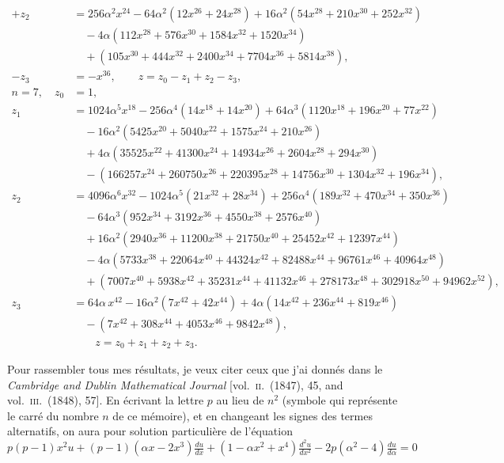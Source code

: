 \documentclass[11pt]{article}
\begin{document}
\[
\begin{aligned}
+z_{2} &= 256\alpha^{2} x^{24} - 64\alpha^{2}(12x^{26} + 24x^{28}) + 16\alpha^{2}(54x^{28} + 210x^{30} + 252x^{32})\\
&\quad - 4\alpha(112x^{28} + 576x^{30} + 1584x^{32} + 1520x^{34})\\
&\quad + (105x^{30} + 444x^{32} + 2400x^{34} + 7704x^{36} + 5814x^{38}),\\
-z_{3} &= -x^{36},\qquad z = z_{0} - z_{1} + z_{2} - z_{3},\\[6pt]
n = 7,\quad z_{0} &= 1,\\
z_{1} &= 1024\alpha^{5} x^{18} - 256\alpha^{4}(14x^{18} + 14x^{20}) + 64\alpha^{3}(1120x^{18} + 196x^{20} + 77x^{22})\\
&\quad - 16\alpha^{2}(5425x^{20} + 5040x^{22} + 1575x^{24} + 210x^{26})\\
&\quad + 4\alpha(35525x^{22} + 41300x^{24} + 14934x^{26} + 2604x^{28} + 294x^{30})\\
&\quad - (166257x^{24} + 260750x^{26} + 220395x^{28} + 14756x^{30} + 1304x^{32} + 196x^{34}),\\
z_{2} &= 4096\alpha^{6} x^{32} - 1024\alpha^{5}(21x^{32} + 28x^{34}) + 256\alpha^{4}(189x^{32} + 470x^{34} + 350x^{36})\\
&\quad - 64\alpha^{3}(952x^{34} + 3192x^{36} + 4550x^{38} + 2576x^{40})\\
&\quad + 16\alpha^{2}(2940x^{36} + 11200x^{38} + 21750x^{40} + 25452x^{42} + 12397x^{44})\\
&\quad - 4\alpha(5733x^{38} + 22064x^{40} + 44324x^{42} + 82488x^{44} + 96761x^{46} + 40964x^{48})\\
&\quad + (7007x^{40} + 5938x^{42} + 35231x^{44} + 41132x^{46} + 278173x^{48} + 302918x^{50} + 94962x^{52}),\\
z_{3} &= 64\alpha\,x^{42} - 16\alpha^{2}(7x^{42} + 42x^{44}) + 4\alpha(14x^{42} + 236x^{44} + 819x^{46})\\
&\quad - (7x^{42} + 308x^{44} + 4053x^{46} + 9842x^{48}),\\
&\qquad z = z_{0} + z_{1} + z_{2} + z_{3}.
\end{aligned}
\]

Pour rassembler tous mes r\'esultats, je veux citer ceux que j'ai donn\'es dans le \emph{Cambridge and Dublin Mathematical Journal} [vol.~\textsc{ii}.\ (1847), 45, and vol.~\textsc{iii}.\ (1848), 57]. En \'ecrivant la lettre $p$ au lieu de $n^{2}$ (symbole qui repr\'esente le carr\'e du nombre $n$ de ce m\'emoire), et en changeant les signes des termes alternatifs, on aura pour solution particuli\`ere de l'\'equation
\[
p(p-1)x^{2}u + (p-1)(\alpha x - 2x^{3})\tfrac{du}{dx} + (1 - \alpha x^{2} + x^{4})\tfrac{d^{2}u}{dx^{2}} - 2p(\alpha^{2} - 4)\tfrac{du}{d\alpha} = 0
\]
\end{document}
